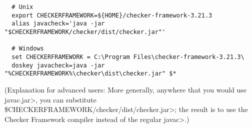 \begin{itemize}
\begin{Verbatim}
  # Unix
  export CHECKERFRAMEWORK=${HOME}/checker-framework-3.21.3
  alias javacheck='java -jar "$CHECKERFRAMEWORK/checker/dist/checker.jar"'

  # Windows
  set CHECKERFRAMEWORK = C:\Program Files\checker-framework-3.21.3\
  doskey javacheck=java -jar "%CHECKERFRAMEWORK%\checker\dist\checker.jar" $*
\end{Verbatim}

  (Explanation for advanced users:
  More generally, anywhere that you would use \<javac.jar>, you can substitute
  \<\$CHECKERFRAMEWORK/checker/dist/checker.jar>;
  the result is to use the Checker
  Framework compiler instead of the regular \<javac>.)

\end{itemize}



%
%
%
%
%
%
%
%
%


